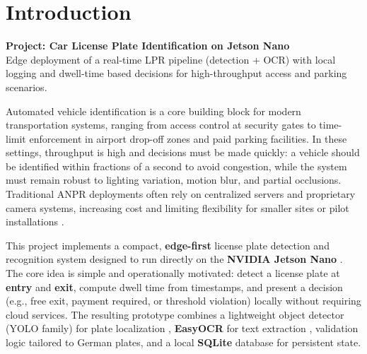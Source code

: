 %
%
%

\chapter{Introduction}
\label{ch:introduction}

\begin{center}
	\textbf{Project: Car License Plate Identification on Jetson Nano}\\
	Edge deployment of a real-time \ac{LPR} pipeline (detection + \ac{OCR}) with local logging and dwell-time based decisions for high-throughput access and parking scenarios.
\end{center}

\vspace{0.4cm}

Automated vehicle identification is a core building block for modern transportation systems, ranging from access control at security gates to time-limit enforcement in airport drop-off zones and paid parking facilities. In these settings, throughput is high and decisions must be made quickly: a vehicle should be identified within fractions of a second to avoid congestion, while the system must remain robust to lighting variation, motion blur, and partial occlusions. Traditional \ac{ANPR} deployments often rely on centralized servers and proprietary camera systems, increasing cost and limiting flexibility for smaller sites or pilot installations \cite{anpr-survey-2020}.

This project implements a compact, \textbf{edge-first} license plate detection and recognition system designed to run directly on the \textbf{NVIDIA Jetson Nano} \cite{JetsonNano2022}. The core idea is simple and operationally motivated: detect a license plate at \textbf{entry} and \textbf{exit}, compute dwell time from timestamps, and present a decision (e.g., free exit, payment required, or threshold violation) locally without requiring cloud services. The resulting prototype combines a lightweight object detector (YOLO family) for plate localization \cite{Ultralytics2023}, \textbf{EasyOCR} for text extraction \cite{easyocr-2020}, validation logic tailored to German plates, and a local \textbf{SQLite} database for persistent state.

